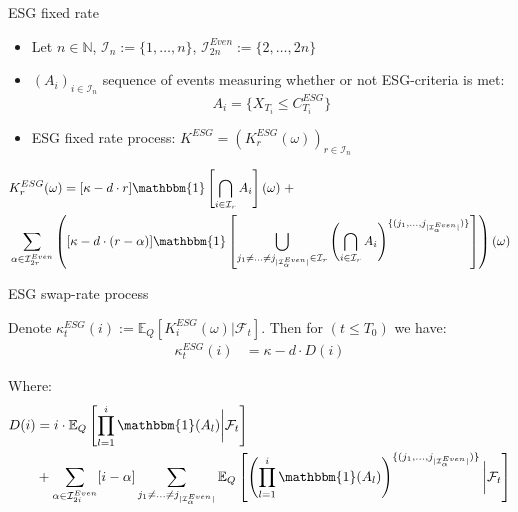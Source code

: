\documentclass[UKenglish]{beamer}
\newcommand{\E}{\mathbb{E}}  %
\newcommand{\F}{\mathcal{F}} %
\begin{document}
\begin{frame}{ESG fixed rate}
\begin{itemize}
    \item Let $n\in \mathbb{N}$, $\mathcal{I}_{n} := \{1, \dots, n\}$, $\mathcal{I}_{2n}^{Even} := \{2, \dots, 2n\}$
    \item $(A_{i})_{i \in \mathcal{I}_{n}}$ sequence of events measuring whether or not ESG-criteria is met:
    \[
    A_{i} = \{X_{T_{i}} \leq C_{T_{i}}^{ESG}\}
    \]
    \item ESG fixed rate process: $K^{ESG} = (K_{r}^{ESG}(\omega))_{r\in \mathcal{I}_{n}}$ 
\end{itemize}

\begin{observation}
\begin{align*}
&K_{r}^{ESG}(\omega) = 
[\kappa -d\cdot r]\mathbbm{1}\left[
\bigcap_{i\in \mathcal{I}_{r}}A_{i}
\right](\omega)\; +\\ 
&\sum_{\alpha \in \mathcal{I}_{2r}^{Even}}
\left(
[\kappa -d\cdot (r-\alpha)]\mathbbm{1}\left[
\bigcup_{
j_{1}\neq \dots \neq j_{|\mathcal{I}_{\alpha}^{Even}|}
\in \mathcal{I}_{r}
}\left(
\bigcap_{i\in \mathcal{I}_{r}}A_{i}
\right)^{
\{
(j_{1}, \dots , j_{|\mathcal{I}_{\alpha}^{Even}|})
\}
}
\right]
\right)(\omega) 
\end{align*} 
\end{observation}
\end{frame}


\begin{frame}{ESG swap-rate process}
\begin{proposition}[Swap rate process $\kappa_{t}^{ESG} = (\kappa_{t}^{ESG}(i))_{i\in \mathcal{I}_{n}}$]
Denote $\kappa_{t}^{ESG}(i) := \E_{Q}[K_{i}^{ESG}(\omega)|\F_{t}]$. 
Then for $(t\leq T_{0})$ we have: 
\begin{align*}
\kappa_{t}^{ESG}(i)
&= 
\kappa -d\cdot D(i)
\end{align*}

Where: 
\begin{align*}
 D(i) &= 
i\cdot \E_{Q}\left[
\prod_{l=1}^{i}\mathbbm{1}(A_{l})\bigg{|}\F_{t}
\right] \\
&+ 
\sum_{\alpha \in \mathcal{I}_{2i}^{Even}}[i-\alpha]
\sum_{
j_{1}\neq \dots \neq j_{|\mathcal{I}_{\alpha}^{Even}|}
}
\E_{Q}\left[
\left(
\prod_{l=1}^{i}\mathbbm{1}(A_{l})
\right)^{
\{
(j_{1}, \dots , j_{|\mathcal{I}_{\alpha}^{Even}|})
\}
}
\bigg{|}\F_{t}
\right]   
\end{align*}
\end{proposition}
\end{frame}
\end{document}
